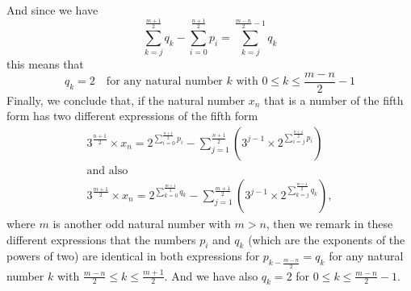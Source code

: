 \documentclass[11pt,a4paper]{article}
\newcommand{\Pf}[4]{2^{\sum_{#4=0}^{#1}#3_{#4}}-\sum_{j=1}^{#2}\left(3^{j-1}\times 2^{\sum_{#4=j}^{#1}#3_{#4}}\right)}
\theoremstyle{definition}
\begin{document}
And since we have
\begin{equation}
\sum_{k=j}^{\frac{m+1}{2}}q_k-\sum_{i=0}^{\frac{n+1}{2}}p_i=\sum_{k=j}^{\frac{m-n}{2}-1}q_k
\end{equation}
this means that
\begin{equation}
q_k=2\quad\text{for any natural number }k\text{ with }0\le k\le\frac{m-n}{2}-1
\end{equation}
Finally, we conclude that, if the natural number $x_n$ that is a number of the fifth form
has two different expressions of the fifth form
\begin{gather*}
3^{\frac{n+1}{2}}\times x_n=\Pf{\frac{n+1}{2}}{\frac{n+1}{2}}{p}{i}\\
\text{and also}\\
3^{\frac{m+1}{2}}\times x_n=\Pf{\frac{m+1}{2}}{\frac{m+1}{2}}{q}{k},
\end{gather*}
where $m$ is another odd natural number with $m>n$, then we remark in these different
expressions that the numbers $p_i$ and $q_k$ (which are the exponents of the powers of two)
are identical in both expressions for $p_{k-\frac{m-n}{2}}=q_k$ for any natural number $k$
with $\frac{m-n}{2}\le k\le\frac{m+1}{2}$. And we have also $q_k=2$ for
$0\le k\le\frac{m-n}{2}-1$.
\end{document}

